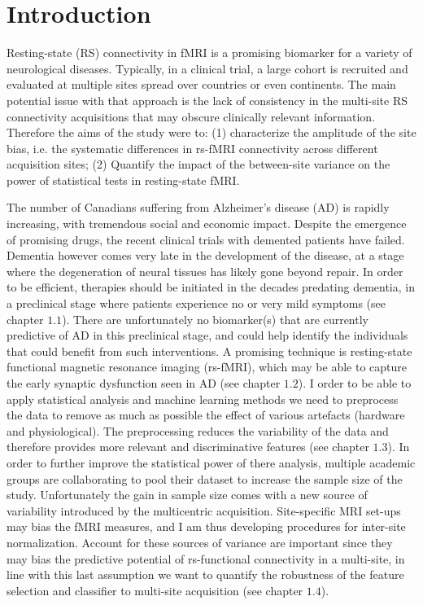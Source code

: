 \documentclass[authoryear]{elsarticle}
\begin{document}
\section{Introduction}

Resting-state (RS) connectivity in fMRI is a promising biomarker for a variety of neurological diseases. Typically, in a clinical trial, a large cohort is recruited and evaluated at multiple sites spread over countries or even continents. The main potential issue with that approach is the lack of consistency in the multi-site RS connectivity acquisitions that may obscure clinically relevant information. Therefore the aims of the study were to: (1) characterize the amplitude of the site bias, i.e. the systematic differences in rs-fMRI connectivity across different acquisition sites; (2) Quantify the impact of the between-site variance on the power of statistical tests in resting-state fMRI.

The number of Canadians suffering from Alzheimer's disease (AD) is rapidly increasing, with tremendous social and economic impact. Despite the emergence of promising drugs, the recent clinical trials with demented patients have failed. Dementia however comes very late in the development of the disease, at a stage where the degeneration of neural tissues has likely gone beyond repair. In order to be efficient, therapies should be initiated in the decades predating dementia, in a preclinical stage where patients experience no or very mild symptoms (see chapter $1.1$). There are unfortunately no biomarker(s) that are currently predictive of AD in this preclinical stage, and could help identify the individuals that could benefit from such interventions. A promising technique is resting-state functional magnetic resonance imaging (rs-fMRI), which may be able to capture the early synaptic dysfunction seen in AD (see chapter $1.2$). I order to be able to apply statistical analysis and machine learning methods we 
need to preprocess the data to remove as much as possible the effect of various artefacts (hardware and physiological). The preprocessing reduces the variability of the data and therefore provides more relevant and discriminative features (see chapter $1.3$). In order to further improve the statistical power of there analysis, multiple academic groups are collaborating to pool their dataset to increase the sample size of the study. Unfortunately the gain in sample size comes with a new source of variability introduced by the multicentric acquisition. Site-specific MRI set-ups may bias the fMRI measures, and I am thus developing procedures for inter-site normalization. Account for these sources of variance are important since they may bias the predictive potential of rs-functional connectivity in a multi-site, in line with this last assumption we want to quantify the robustness of the feature selection and classifier to multi-site acquisition (see chapter $1.4$).
\end{document}
